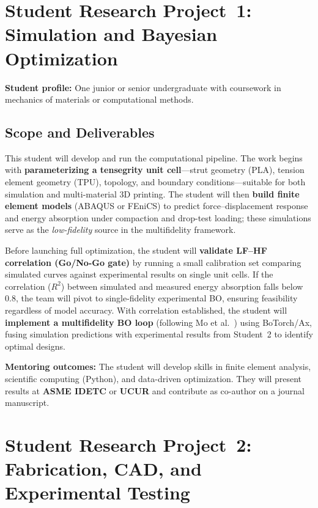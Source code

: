 \documentclass[11pt]{article}
\begin{document}
\section{Student Research Project~1: Simulation and Bayesian Optimization}

\textbf{Student profile:} One junior or senior undergraduate with coursework in
mechanics of materials or computational methods.

\subsection*{Scope and Deliverables}

This student will develop and run the computational pipeline.  The work begins
with \textbf{parameterizing a tensegrity unit cell}---strut geometry (PLA),
tension element geometry (TPU), topology, and boundary conditions---suitable for
both simulation and multi-material 3D printing.  The student will then
\textbf{build finite element models} (ABAQUS or FEniCS) to predict
force--displacement response and energy absorption under compaction and
drop-test loading; these simulations serve as the \emph{low-fidelity} source in
the multifidelity framework.

Before launching full optimization, the student will \textbf{validate LF--HF
correlation (Go/No-Go gate)} by running a small calibration set comparing
simulated curves against experimental results on single unit cells.  If the
correlation ($R^2$) between simulated and measured energy absorption falls below
0.8, the team will pivot to single-fidelity experimental BO, ensuring
feasibility regardless of model accuracy.  With correlation established, the
student will \textbf{implement a multifidelity BO loop} (following
Mo et al.\ \citep{mo2023accelerated}) using BoTorch/Ax, fusing simulation
predictions with experimental results from Student~2 to identify optimal
designs.

\textbf{Mentoring outcomes:} The student will develop skills in finite element
analysis, scientific computing (Python), and data-driven optimization.  They
will present results at \textbf{ASME IDETC} or \textbf{UCUR} and contribute as
co-author on a journal manuscript.

\section{Student Research Project~2: Fabrication, CAD, and Experimental Testing}
\end{document}
